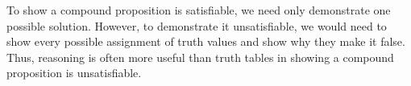 To show a compound proposition is satisfiable, we need only demonstrate one possible solution.
However, to demonstrate it unsatisfiable, we would need to show every possible assignment of truth values and show why they make it false.
Thus, reasoning is often more useful than truth tables in showing a compound proposition is unsatisfiable.

